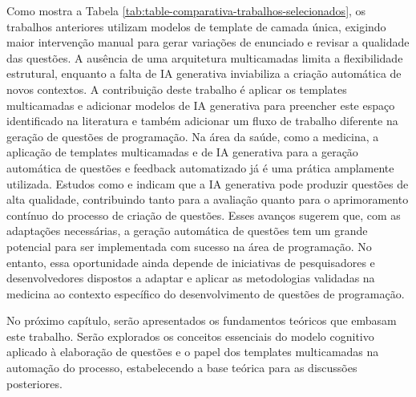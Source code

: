Como mostra a Tabela \ref{tab:table-comparativa-trabalhos-selecionados}, os trabalhos anteriores utilizam modelos de template de camada única, exigindo maior intervenção manual para gerar variações de enunciado e revisar a qualidade das questões. A ausência de uma arquitetura multicamadas limita a flexibilidade estrutural, enquanto a falta de IA generativa inviabiliza a criação automática de novos contextos. A contribuição deste trabalho é aplicar os templates multicamadas e adicionar modelos de IA generativa para preencher este espaço identificado na literatura e também adicionar um fluxo de trabalho diferente na geração de questões de programação.
Na área da saúde, como a medicina, a aplicação de templates multicamadas e de IA generativa para a geração automática de questões e feedback automatizado já é uma prática amplamente utilizada. Estudos como \parencite{falcao2023} e \parencite{kiyak2024} indicam que a IA generativa pode produzir questões de alta qualidade, contribuindo tanto para a avaliação quanto para o aprimoramento contínuo do processo de criação de questões. Esses avanços sugerem que, com as adaptações necessárias, a geração automática de questões tem um grande potencial para ser implementada com sucesso na área de programação.
No entanto, essa oportunidade ainda depende de iniciativas de pesquisadores e desenvolvedores dispostos a adaptar e aplicar as metodologias validadas na medicina ao contexto específico do desenvolvimento de questões de programação.

No próximo capítulo, serão apresentados os fundamentos teóricos que embasam este trabalho.  Serão explorados os conceitos essenciais do modelo cognitivo aplicado à elaboração de questões e o papel dos templates multicamadas na automação do processo, estabelecendo a base teórica para as discussões posteriores. 



